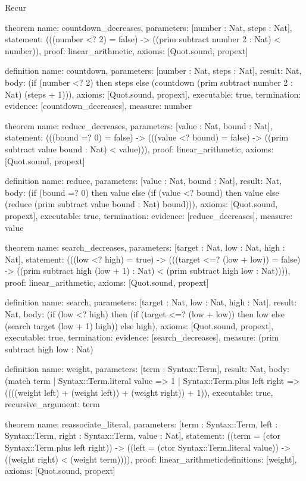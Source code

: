 \begin{lexlean}{Recur}
\begin{semanticmodule}
theorem{
  name: countdown_decreases,
  parameters: [number : Nat, steps : Nat],
  statement: (((number <? 2) = false) -> ((prim subtract number 2 : Nat) < number)),
  proof: linear_arithmetic{},
  axioms: [Quot.sound, propext]
}

definition{
  name: countdown,
  parameters: [number : Nat, steps : Nat],
  result: Nat,
  body: (if (number <? 2) then steps else (countdown (prim subtract number 2 : Nat) (steps + 1))),
  axioms: [Quot.sound, propext],
  executable: true,
  termination: {evidence: [countdown_decreases], measure: number}
}

theorem{
  name: reduce_decreases,
  parameters: [value : Nat, bound : Nat],
  statement: (((bound =? 0) = false) -> (((value <? bound) = false) -> ((prim subtract value bound : Nat) < value))),
  proof: linear_arithmetic{},
  axioms: [Quot.sound, propext]
}

definition{
  name: reduce,
  parameters: [value : Nat, bound : Nat],
  result: Nat,
  body: (if (bound =? 0) then value else (if (value <? bound) then value else (reduce (prim subtract value bound : Nat) bound))),
  axioms: [Quot.sound, propext],
  executable: true,
  termination: {evidence: [reduce_decreases], measure: value}
}

theorem{
  name: search_decreases,
  parameters: [target : Nat, low : Nat, high : Nat],
  statement: (((low <? high) = true) -> (((target <=? (low + low)) = false) -> ((prim subtract high (low + 1) : Nat) < (prim subtract high low : Nat)))),
  proof: linear_arithmetic{},
  axioms: [Quot.sound, propext]
}

definition{
  name: search,
  parameters: [target : Nat, low : Nat, high : Nat],
  result: Nat,
  body: (if (low <? high) then (if (target <=? (low + low)) then low else (search target (low + 1) high)) else high),
  axioms: [Quot.sound, propext],
  executable: true,
  termination: {evidence: [search_decreases], measure: (prim subtract high low : Nat)}
}

definition{
  name: weight,
  parameters: [term : Syntax::Term],
  result: Nat,
  body: (match term
    | Syntax::Term.literal value => 1
    | Syntax::Term.plus left right => ((((weight left) + (weight left)) + (weight right)) + 1)),
  executable: true,
  recursive_argument: term
}

theorem{
  name: reassociate_literal,
  parameters: [term : Syntax::Term, left : Syntax::Term, right : Syntax::Term, value : Nat],
  statement: ((term = (ctor Syntax::Term.plus left right)) -> ((left = (ctor Syntax::Term.literal value)) -> ((weight right) < (weight term)))),
  proof: linear_arithmetic{definitions: [weight]},
  axioms: [Quot.sound, propext]
}


\end{semanticmodule}
\end{lexlean}
